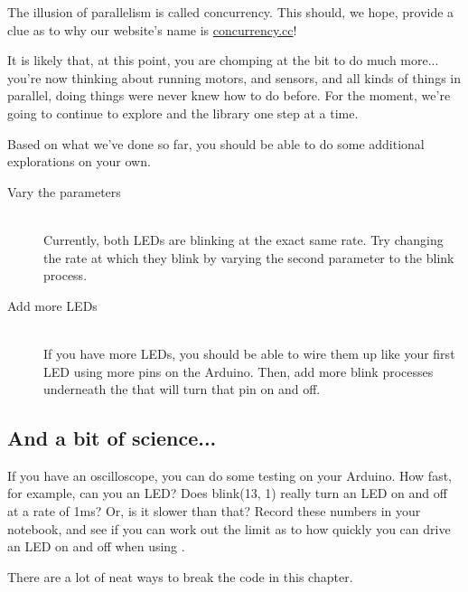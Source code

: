 The illusion of parallelism is called {\strong concurrency}. This should, we hope, provide a clue as to why our website's name is \url{concurrency.cc}! 



\EXPLORATIONS
It is likely that, at this point, you are chomping at the bit to do much more... you're now thinking about running motors, and sensors, and all kinds of things in parallel, doing things were never knew how to do before. For the moment, we're going to continue to explore \occam and the \plumbing library one step at a time.

Based on what we've done so far, you should be able to do some additional explorations on your own.

\begin{description}
	\item[Vary the parameters]\ \\
	Currently, both LEDs are blinking at the exact same rate. Try changing the rate at which they blink by varying the second parameter to the {\procname blink} process.
	\item[Add more LEDs]\ \\
	If you have more LEDs, you should be able to wire them up like your first LED using more pins on the Arduino. Then, add more {\procname blink} processes underneath the \PAR that will turn that pin on and off.
\end{description}

\subsection*{And a bit of science...}
If you have an oscilloscope, you can do some testing on your Arduino. How fast, for example, can you \blink an LED? Does {\code blink(13, 1)} really turn an LED on and off at a rate of 1ms? Or, is it slower than that? Record these numbers in your notebook, and see if you can work out the limit as to how quickly you can drive an LED on and off when using \plumbing.

\newpage

\BREAKAGE
There are a lot of neat ways to break the code in this chapter.

